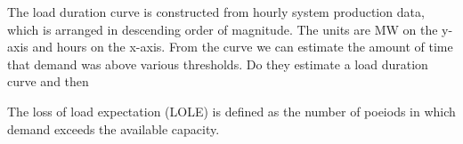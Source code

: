 \documentclass[10pt]{amsart}
\begin{document}
The load duration curve is constructed from hourly system production data, which is arranged in descending order of magnitude. 
The units are MW on the y-axis and hours on the x-axis. 
From the curve we can estimate the amount of time that demand was above various thresholds. 
Do they estimate a load duration curve and then 

The loss of load expectation (LOLE) is defined as the number of poeiods in which demand exceeds the available capacity.
\end{document}

